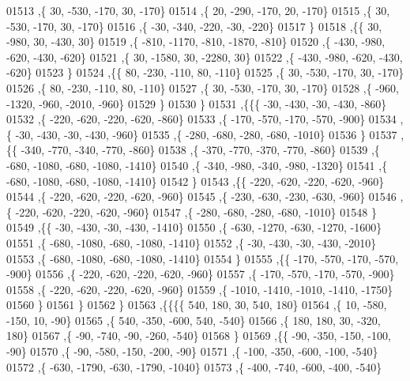 \begin{DoxyCode}
01513     ,\{    30,  -530,  -170,    30,  -170\}
01514     ,\{    20,  -290,  -170,    20,  -170\}
01515     ,\{    30,  -530,  -170,    30,  -170\}
01516     ,\{   -30,  -340,  -220,   -30,  -220\}
01517     \}
01518    ,\{\{    30,  -980,    30,  -430,    30\}
01519     ,\{  -810, -1170,  -810, -1870,  -810\}
01520     ,\{  -430,  -980,  -620,  -430,  -620\}
01521     ,\{    30, -1580,    30, -2280,    30\}
01522     ,\{  -430,  -980,  -620,  -430,  -620\}
01523     \}
01524    ,\{\{    80,  -230,  -110,    80,  -110\}
01525     ,\{    30,  -530,  -170,    30,  -170\}
01526     ,\{    80,  -230,  -110,    80,  -110\}
01527     ,\{    30,  -530,  -170,    30,  -170\}
01528     ,\{  -960, -1320,  -960, -2010,  -960\}
01529     \}
01530    \}
01531   ,\{\{\{   -30,  -430,   -30,  -430,  -860\}
01532     ,\{  -220,  -620,  -220,  -620,  -860\}
01533     ,\{  -170,  -570,  -170,  -570,  -900\}
01534     ,\{   -30,  -430,   -30,  -430,  -960\}
01535     ,\{  -280,  -680,  -280,  -680, -1010\}
01536     \}
01537    ,\{\{  -340,  -770,  -340,  -770,  -860\}
01538     ,\{  -370,  -770,  -370,  -770,  -860\}
01539     ,\{  -680, -1080,  -680, -1080, -1410\}
01540     ,\{  -340,  -980,  -340,  -980, -1320\}
01541     ,\{  -680, -1080,  -680, -1080, -1410\}
01542     \}
01543    ,\{\{  -220,  -620,  -220,  -620,  -960\}
01544     ,\{  -220,  -620,  -220,  -620,  -960\}
01545     ,\{  -230,  -630,  -230,  -630,  -960\}
01546     ,\{  -220,  -620,  -220,  -620,  -960\}
01547     ,\{  -280,  -680,  -280,  -680, -1010\}
01548     \}
01549    ,\{\{   -30,  -430,   -30,  -430, -1410\}
01550     ,\{  -630, -1270,  -630, -1270, -1600\}
01551     ,\{  -680, -1080,  -680, -1080, -1410\}
01552     ,\{   -30,  -430,   -30,  -430, -2010\}
01553     ,\{  -680, -1080,  -680, -1080, -1410\}
01554     \}
01555    ,\{\{  -170,  -570,  -170,  -570,  -900\}
01556     ,\{  -220,  -620,  -220,  -620,  -960\}
01557     ,\{  -170,  -570,  -170,  -570,  -900\}
01558     ,\{  -220,  -620,  -220,  -620,  -960\}
01559     ,\{ -1010, -1410, -1010, -1410, -1750\}
01560     \}
01561    \}
01562   \}
01563  ,\{\{\{\{   540,   180,    30,   540,   180\}
01564     ,\{    10,  -580,  -150,    10,   -90\}
01565     ,\{   540,  -350,  -600,   540,  -540\}
01566     ,\{   180,   180,    30,  -320,   180\}
01567     ,\{   -90,  -740,   -90,  -260,  -540\}
01568     \}
01569    ,\{\{   -90,  -350,  -150,  -100,   -90\}
01570     ,\{   -90,  -580,  -150,  -200,   -90\}
01571     ,\{  -100,  -350,  -600,  -100,  -540\}
01572     ,\{  -630, -1790,  -630, -1790, -1040\}
01573     ,\{  -400,  -740,  -600,  -400,  -540\}

\end{DoxyCode}
